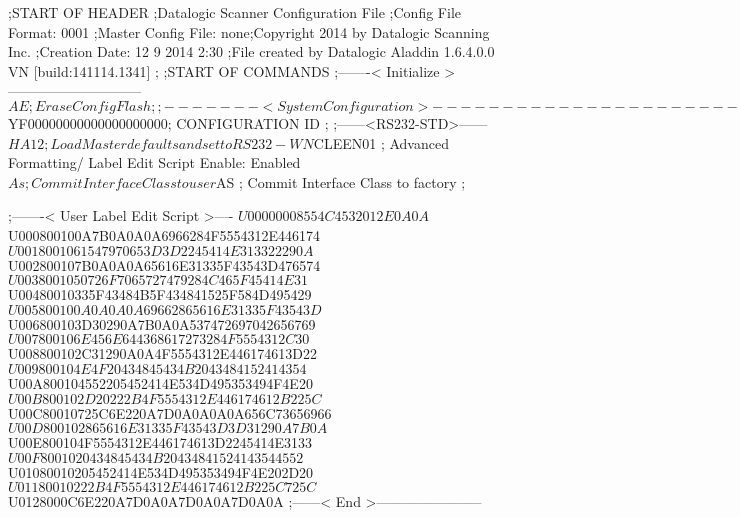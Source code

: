 ;START OF HEADER
;Datalogic Scanner Configuration File
;Config File Format: 0001
;Master Config File: none;Copyright 2014 by Datalogic Scanning Inc.
;Creation Date: 12 9 2014 2:30
;File created by Datalogic Aladdin 1.6.4.0.0 VN [build:141114.1341]
;
;START OF COMMANDS
;-------< Initialize >-----------------------------
$AE                 ; Erase Config Flash
;
;-------< System Configuration >-------------------------------
$YF00000000000000000000; CONFIGURATION ID
;
;------<RS232-STD>------
$HA12               ; Load Master defaults and set to RS232-WN
$CLEEN01            ; Advanced Formatting/ Label Edit Script Enable: Enabled
$As                 ; Commit Interface Class to user
$AS                 ; Commit Interface Class to factory
;

;-------< User Label Edit Script >----
$U00000008554C4532012E0A0A
$U000800100A7B0A0A0A6966284F5554312E446174
$U0018001061547970653D3D2245414E313322290A
$U002800107B0A0A0A65616E31335F43543D476574
$U0038001050726F7065727479284C465F45414E31
$U00480010335F43484B5F434841525F584D495429
$U005800100A0A0A0A69662865616E31335F43543D
$U006800103D30290A7B0A0A537472697042656769
$U007800106E456E644368617273284F5554312C30
$U008800102C31290A0A4F5554312E446174613D22
$U009800104E4F20434845434B2043484152414354
$U00A800104552205452414E534D495353494F4E20
$U00B800102D20222B4F5554312E446174612B225C
$U00C80010725C6E220A7D0A0A0A0A656C73656966
$U00D800102865616E31335F43543D3D31290A7B0A
$U00E800104F5554312E446174613D2245414E3133
$U00F8001020434845434B20434841524143544552
$U01080010205452414E534D495353494F4E202D20
$U01180010222B4F5554312E446174612B225C725C
$U0128000C6E220A7D0A0A7D0A0A7D0A0A
;------< End >-----------------------
